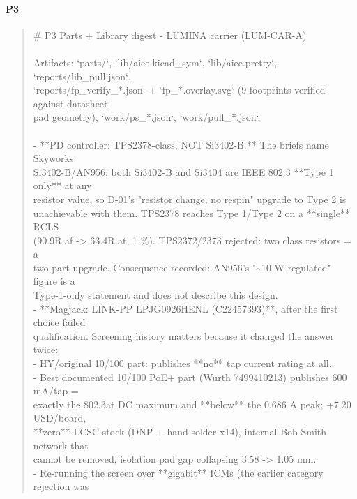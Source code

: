 \documentclass[11pt,a4paper]{article}
\begin{document}
\paragraph*{P3}
\begin{quote}\small\ttfamily\raggedright
\# P3 Parts + Library digest - LUMINA carrier (LUM-CAR-A)\\
~\\
Artifacts: `parts/`, `lib/aiee.kicad\_sym`, `lib/aiee.pretty`, `reports/lib\_pull.json`,\\
`reports/fp\_verify\_{*}.json` + `fp\_{*}.overlay.svg` (9 footprints verified against datasheet\\
pad geometry), `work/ps\_{*}.json`, `work/pull\_{*}.json`.\\
~\\
- {*}{*}PD controller: TPS2378-class, NOT Si3402-B.{*}{*} The briefs name Skyworks\\
  Si3402-B/AN956; both Si3402-B and Si3404 are IEEE 802.3 {*}{*}Type 1 only{*}{*} at any\\
  resistor value, so D-01's "resistor change, no respin" upgrade to Type 2 is\\
  unachievable with them. TPS2378 reaches Type 1/Type 2 on a {*}{*}single{*}{*} RCLS\\
  (90.9R af -\textgreater{} 63.4R at, 1 \%). TPS2372/2373 rejected: two class resistors = a\\
  two-part upgrade. Consequence recorded: AN956's "\textasciitilde{}10 W regulated" figure is a\\
  Type-1-only statement and does not describe this design.\\
- {*}{*}Magjack: LINK-PP LPJG0926HENL (C22457393){*}{*}, after the first choice failed\\
  qualification. Screening history matters because it changed the answer twice:\\
  - HY/original 10/100 part: publishes {*}{*}no{*}{*} tap current rating at all.\\
  - Best documented 10/100 PoE+ part (Wurth 7499410213) publishes 600 mA/tap =\\
    exactly the 802.3at DC maximum and {*}{*}below{*}{*} the 0.686 A peak; +7.20 USD/board,\\
    {*}{*}zero{*}{*} LCSC stock (DNP + hand-solder x14), internal Bob Smith network that\\
    cannot be removed, isolation pad gap collapsing 3.58 -\textgreater{} 1.05 mm.\\
  - Re-running the screen over {*}{*}gigabit{*}{*} ICMs (the earlier category rejection was\\

\end{quote}
\end{document}
